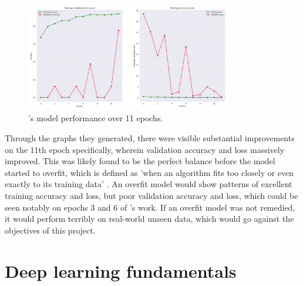 \documentclass[12pt]{report}
\begin{document}
\begin{figure}[H]
    \centering
    \includegraphics[width=0.8\textwidth]{Proposal/MathurModelMetrics.png}
    \caption{\textcite{mathurPneumoniaDetectionUsing2020}'s model performance over 11 epochs.\label{fig:MathurModelMetrics}}
\end{figure}

\noindent Through the graphs they generated, there were visible substantial improvements on the 11th epoch specifically, wherein validation 
accuracy and loss massively improved. This was likely found to be the perfect balance before the model started to overfit, which is defined 
as 'when an algorithm fits too closely or even exactly to its training data' \autocite{ibmWhatOverfittingIBM2021}. An overfit model would 
show patterns of excellent training accuracy and loss, but poor validation accuracy and loss, which could be seen notably on epochs 3 and 6
of \textcite{mathurPneumoniaDetectionUsing2020}'s work. If an overfit model was not remedied, it would perform terribly on real-world unseen 
data, which would go against the objectives of this project.  


\chapter{Deep learning fundamentals}


\end{document}
